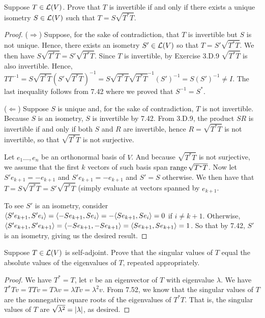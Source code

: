 \begin{exercise}{9}
  Suppose $T\in\mathcal{L}(V)$. Prove that $T$ is invertible if and only if there exists a unique isometry $S\in\mathcal{L}(V)$ such that $T =S\sqrt{T^\ast T}$.
\end{exercise}
\begin{proof}
 ($\Rightarrow$) Suppose, for the sake of contradiction, that $T$ is invertible but $S$ is not unique. Hence, there exists an isometry $S'\in\mathcal{L}(V)$ so that $T=S'\sqrt{T^\ast T}$. We then have $S\sqrt{T^\ast T} =S'\sqrt{T^\ast T}$. Since $T$ is invertible, by Exercise 3.D.9 $\sqrt{T^\ast T}$ is also invertible. Hence, $TT^{-1} =S\sqrt{T^\ast T}(S'\sqrt{T^\ast T})^{-1} =S\sqrt{T^\ast T}\sqrt{T^\ast T}^{-1}(S')^{-1} =S(S')^{-1} \neq I$. The last inequality follows from 7.42 where we proved that $S^{-1}=S^\ast$.

 ($\Leftarrow$) Suppose $S$ is unique and, for the sake of contradiction, $T$ is not invertible. Because $S$ is an isometry, $S$ is invertible by 7.42. From 3.D.9, the product $SR$ is invertible if and only if both $S$ and $R$ are invertible, hence $R =\sqrt{T^\ast T}$ is not invertible, so that $\sqrt{T^\ast T}$ is not surjective. 

 Let $e_1\dots,e_n$ be an orthonormal basis of $V$. And because $\sqrt{T^\ast T}$ is not surjective, we assume that the first $k$ vectors of such basis span $\operatorname*{range}\sqrt{T^\ast T}$. Now let $S'e_{k+1}=-e_{k+1}$ and $S'e_{k+1}=-e_{k+1}$ and $S'=S$ otherwise. We then have that $T=S\sqrt{T^\ast T}=S'\sqrt{T^\ast T}$ (simply evaluate at vectors spanned by $e_{k+1}$. 
 
 To see $S'$ is an isometry, consider $\langle S'e_{k+1},S'e_i\rangle =\langle -Se_{k+1},Se_i\rangle =-\langle Se_{k+1},Se_i\rangle =0$ if $i\neq k+1$. Otherwise, $\langle S'e_{k+1}, S'e_{k+1}\rangle =\langle -Se_{k+1}, -Se_{k+1}\rangle =\langle Se_{k+1}, Se_{k+1}\rangle =1$. So that by 7.42, $S'$ is an isometry, giving us the desired result.
\end{proof}

\begin{exercise}{10}
  Suppose $T\in\mathcal{L}(V)$ is self-adjoint. Prove that the singular values of $T$ equal the absolute values of the eigenvalues of $T$, repeated appropriately.
\end{exercise}
\begin{proof}
 We have $T^\ast =T$, let $v$ be an eigenvector of $T$ with eigenvalue $\lambda$. We have $T^\ast Tv =TTv =T\lambda v =\lambda Tv =\lambda^2v$. From 7.52, we know that the singular values of $T$ are the nonnegative square roots of the eigenvalues of $T^\ast T$. That is, the singular values of $T$ are $\sqrt{\lambda^2} =\left\lvert \lambda\right\rvert$, as desired.
\end{proof}

